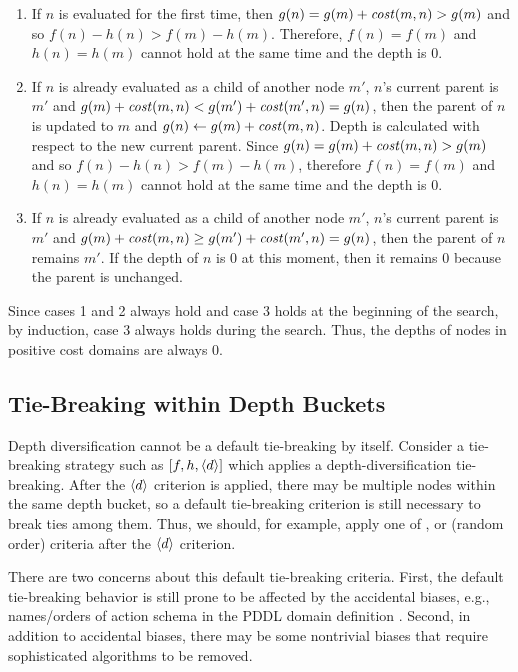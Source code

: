 \begin{enumerate}
 \item If $n$ is evaluated for the first time,
       then $g(n)=g(m)+\mit{cost}(m,n) > g(m)$ and so $f(n)-h(n) > f(m)-h(m)$.
       Therefore, $f(n)=f(m)$ and $h(n)=h(m)$ cannot hold at the same time and the depth is 0.
 \item If $n$ is already evaluated as a child of another node $m'$, $n$'s current parent is $m'$ and
       $g(m)+\mit{cost}(m,n) < g(m') + \mit{cost}(m',n) = g(n)$,
       then the parent of $n$ is updated to $m$ and $g(n)\leftarrow g(m)+\mit{cost}(m,n)$.
       Depth is calculated with respect to the new current parent.
       Since $g(n)=g(m)+\mit{cost}(m,n)>g(m)$ and so $f(n)-h(n) > f(m)-h(m)$,
       therefore $f(n)=f(m)$ and $h(n)=h(m)$ cannot hold at the same time and the depth is 0.
 \item If $n$ is already evaluated as a child of another node $m'$, $n$'s current parent is $m'$ and
       $g(m)+\mit{cost}(m,n) \geq g(m') + \mit{cost}(m',n) = g(n)$, then the parent of $n$ remains $m'$. If the
       depth of $n$ is 0 at this moment, then it remains 0 because the parent is unchanged.
\end{enumerate}
% 
Since cases 1 and 2 always hold and case 3 holds at the beginning of the search,
by induction, case 3 always holds during the search.
Thus, the depths of nodes in positive cost domains are always 0.

\subsection{Tie-Breaking within Depth Buckets}

Depth diversification cannot be a default tie-breaking by itself.
Consider a tie-breaking strategy such as $[f,h,\depth]$ which applies a depth-diversification tie-breaking.
After the $\depth$ criterion is applied, 
there may be multiple nodes within the same depth bucket, so a
default tie-breaking criterion is still necessary to break ties among them.
Thus, we should, for example, apply one of \lifo, \fifo or \ro (random order) criteria
after the $\depth$ criterion.

There are two concerns about this default tie-breaking criteria.
First, the default tie-breaking behavior is still prone to be
affected by the accidental biases, e.g., names/orders of action schema in the PDDL domain definition \cite{vallati2015effective}.
Second, in addition to accidental biases, there may be some nontrivial biases that require 
sophisticated algorithms to be removed.

